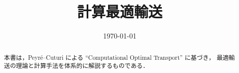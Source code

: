 \documentclass[uplatex, dvipdfmx]{jsreport}
\title{計算最適輸送}
\author{}
\date{\today}
\begin{document}
\maketitle

\begin{abstract}
本書は，Peyré--Cuturi による ``Computational Optimal Transport'' に基づき，
最適輸送の理論と計算手法を体系的に解説するものである．
\end{abstract}

\tableofcontents






% 
% 
\end{document}
